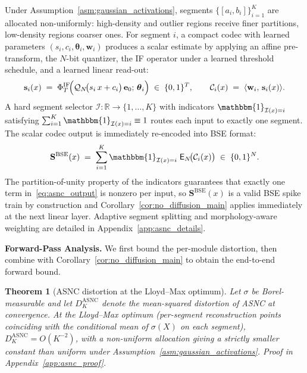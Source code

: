 \documentclass{article}
\theoremstyle{plain}
\newtheorem{theorem}{Theorem}[section]
\theoremstyle{definition}
\theoremstyle{remark}
\begin{document}
Under Assumption~\ref{asm:gaussian_activations}, segments
$\{[a_i,b_i]\}_{i=1}^{K}$ are allocated non-uniformly: high-density and
outlier regions receive finer partitions, low-density regions coarser ones.
For segment $i$, a compact codec with learned parameters
$(s_i,c_i,\boldsymbol{\theta}_i,\mathbf{w}_i)$ produces a scalar estimate by
applying an affine pre-transform, the $N$-bit quantizer, the IF operator
under a learned threshold schedule, and a learned linear read-out:
\begin{equation}
\label{eq:asnc_codec}
\mathbf{s}_i(x)
  \;=\; \Phi_T^{\mathrm{IF}}\!\Bigl(
        \mathcal{Q}_N\!\bigl(s_i\,x+c_i\bigr)\,\mathbf{e}_0;\,
        \boldsymbol{\theta}_i\Bigr) \;\in\; \{0,1\}^T,
\qquad
\mathcal{C}_i(x) \;=\; \langle \mathbf{w}_i,\,\mathbf{s}_i(x)\rangle.
\end{equation}
A hard segment selector $\mathcal{I}:\mathbb{R}\to\{1,\dots,K\}$ with
indicators $\mathbbm{1}_{\mathcal{I}(x)=i}$ satisfying
$\sum_{i=1}^{K}\mathbbm{1}_{\mathcal{I}(x)=i}\equiv 1$ routes each input to
exactly one segment. The scalar codec output is immediately re-encoded into
BSE format:
\begin{equation}
\label{eq:asnc_output}
\mathbf{S}^{\mathrm{BSE}}(x)
  \;=\; \sum_{i=1}^{K}
        \mathbbm{1}_{\mathcal{I}(x)=i}\;
        \mathsf{E}_N\!\bigl(\mathcal{C}_i(x)\bigr)
  \;\in\; \{0,1\}^N.
\end{equation}
The partition-of-unity property of the indicators guarantees that exactly
one term in~\eqref{eq:asnc_output} is nonzero per input, so
$\mathbf{S}^{\mathrm{BSE}}(x)$ is a valid BSE spike train by construction
and Corollary~\ref{cor:no_diffusion_main} applies immediately at the next
linear layer. Adaptive segment splitting and morphology-aware weighting are
detailed in Appendix~\ref{app:asnc_details}.

\noindent\textbf{Forward-Pass Analysis.}
\label{subsubsec:asnc_forward}
We first bound the per-module distortion, then combine with
Corollary~\ref{cor:no_diffusion_main} to obtain the end-to-end forward bound.
\begin{theorem}[ASNC distortion at the Lloyd--Max optimum]
\label{thm:asnc_bound}
Let $\sigma$ be Borel-measurable and let $D_K^{\mathrm{ASNC}}$ denote the
mean-squared distortion of ASNC at convergence. At the Lloyd--Max optimum
(per-segment reconstruction points coinciding with the conditional mean of
$\sigma(X)$ on each segment), $D_K^{\mathrm{ASNC}}=O(K^{-2})$, with a
non-uniform allocation giving a strictly smaller constant than uniform
under Assumption~\ref{asm:gaussian_activations}. Proof in
Appendix~\ref{app:asnc_proof}.
\end{theorem}
\end{document}
